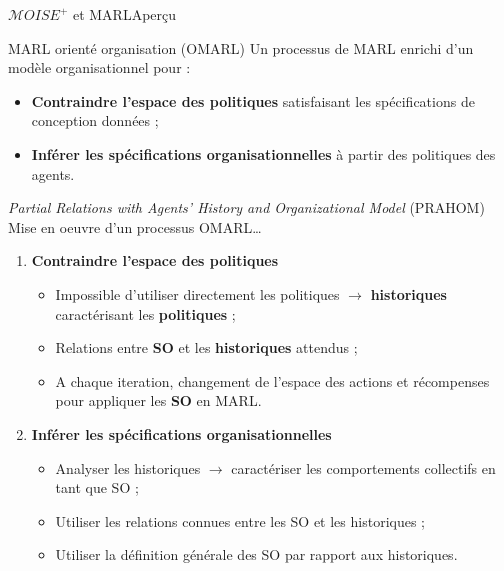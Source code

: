 \begin{frame}{$\mathcal{M}OISE^+$ et MARL}{Aperçu}

    \begin{block}{MARL orienté organisation (OMARL)}
        Un processus de MARL enrichi d'un modèle organisationnel pour :
        \begin{itemize}
            \item \textbf{Contraindre l'espace des politiques} satisfaisant les spécifications de conception données ;
            \item \textbf{Inférer les spécifications organisationnelles} à partir des politiques des agents.
        \end{itemize}
    \end{block}

    \begin{block}{\emph{Partial Relations with Agents' History and Organizational Model} (PRAHOM)}
        Mise en oeuvre d'un processus OMARL\dots
        \begin{enumerate}
            \item \textbf{Contraindre l'espace des politiques}
                  \begin{itemize}
                      \item Impossible d'utiliser directement les politiques $\rightarrow$ \textbf{historiques} caractérisant les \textbf{politiques} ;
                      \item Relations entre \textbf{SO} et les \textbf{historiques} attendus ;
                      \item A chaque iteration, changement de l'espace des actions et récompenses pour appliquer les \textbf{SO} en MARL.
                  \end{itemize}

            \item \textbf{Inférer les spécifications organisationnelles}
                  \begin{itemize}
                      \item Analyser les historiques $\rightarrow$ caractériser les comportements collectifs en tant que SO ;
                      \item Utiliser les relations connues entre les SO et les historiques ;
                      \item Utiliser la définition générale des SO par rapport aux historiques.
                  \end{itemize}
        \end{enumerate}
    \end{block}
\end{frame}




